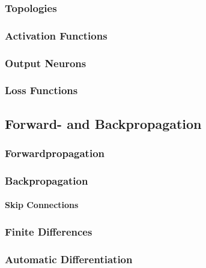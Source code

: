 			\subsubsection{Topologies} %

			\subsubsection{Activation Functions} %

			\subsubsection{Output Neurons} %

			\subsubsection{Loss Functions} %

		\subsection{Forward- and Backpropagation} %

			\subsubsection{Forwardpropagation} %

			\subsubsection{Backpropagation} %

				\paragraph{Skip Connections} %

			\subsubsection{Finite Differences} %

			\subsubsection{Automatic Differentiation} %

